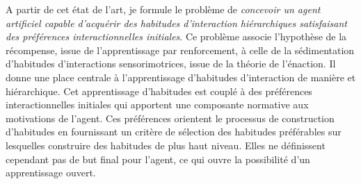 A partir de cet état de l'art, je formule le problème de \emph{concevoir un agent artificiel 
	capable d'acquérir des habitudes d'interaction hiérarchiques satisfaisant des préférences interactionnelles initiales}.
Ce problème associe l'hypothèse de la récompense, issue de l'apprentissage par renforcement, à celle de la sédimentation d'habitudes d'interactions sensorimotrices, issue de la théorie de l'énaction.
Il donne une place centrale à l'apprentissage d'habitudes d'interaction de manière  et hiérarchique.
Cet apprentissage d'habitudes est couplé à des préférences interactionnelles initiales qui apportent une composante normative aux motivations de l'agent. 
Ces préférences orientent le processus de construction d'habitudes en fournissant un critère de sélection des habitudes préférables sur lesquelles construire des habitudes de plus haut niveau.
Elles ne définissent cependant pas de but final pour l'agent, ce qui ouvre la possibilité d'un apprentissage ouvert. 
 


























